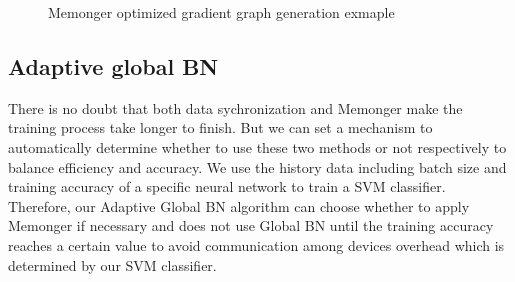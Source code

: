 \begin{figure}[h]
    \begin{center}
    \caption{Memonger optimized gradient graph generation exmaple }%
    \label{fig:Memonger}
    \end{center}
    \end{figure}


\subsection{Adaptive global BN}


There is no doubt that both data sychronization and Memonger make the training process take longer to finish. But we can set a mechanism to automatically determine whether to use these two methods or not respectively to balance efficiency and accuracy.
We use the history data including batch size and training accuracy of a specific neural network to train a SVM classifier. Therefore, our Adaptive Global BN algorithm can choose whether to apply Memonger if necessary and does not use Global BN until the training accuracy reaches a certain value to avoid communication among devices overhead which is determined by our SVM classifier.








